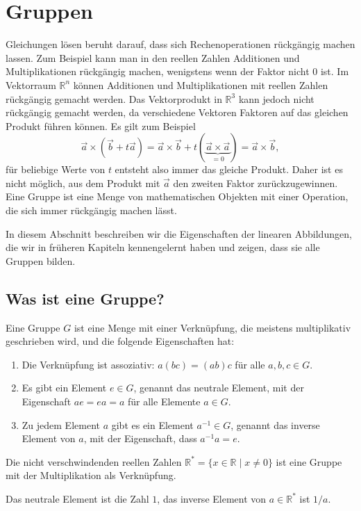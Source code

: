 %
%
%
\section{Gruppen\label{section:gruppen}}
Gleichungen lösen beruht darauf, dass sich Rechenoperationen rückgängig
machen lassen.
Zum Beispiel kann man in den reellen Zahlen Additionen und Multiplikationen
rückgängig machen, wenigstens wenn der Faktor nicht $0$ ist.
Im Vektorraum $\mathbb R^n$ können Additionen und
Multiplikationen mit reellen Zahlen rückgängig gemacht werden.
Das Vektorprodukt in $\mathbb R^3$ kann jedoch nicht rückgängig gemacht
werden, da verschiedene Vektoren Faktoren auf das gleichen Produkt
führen können.
Es gilt zum Beispiel
\[
\vec{a} \times (\vec{b} + t\vec{a})
=
\vec{a} \times \vec{b} + t(\underbrace{\vec{a}\times\vec{a}}_{=0})
=
\vec{a} \times \vec{b},
\]
für beliebige Werte von $t$ entsteht also immer das gleiche Produkt.
Daher ist es nicht möglich, aus dem Produkt mit $\vec{a}$ den
zweiten Faktor zurückzugewinnen.
Eine Gruppe ist eine Menge von mathematischen Objekten mit einer
Operation, die sich immer rückgängig machen lässt.

In diesem Abschnitt beschreiben wir die Eigenschaften der linearen
Abbildungen, die wir in früheren Kapiteln kennengelernt haben und
zeigen, dass sie alle Gruppen bilden.

%
%
\subsection{Was ist eine Gruppe?}
\begin{definition}
Eine Gruppe $G$ ist eine Menge mit einer Verknüpfung, die meistens
multiplikativ geschrieben wird, und die folgende Eigenschaften hat:
\begin{enumerate}
\item Die Verknüpfung ist assoziativ: $a(bc)=(ab)c$ für alle $a,b,c\in G$.
\item Es gibt ein Element $e\in G$, genannt das neutrale Element,
mit der Eigenschaft $ae=ea=a$ für alle
Elemente $a\in G$.
\item Zu jedem Element $a$ gibt es ein Element $a^{-1}\in G$, genannt
das inverse Element von $a$, mit der
Eigenschaft, dass $a^{-1}a=e$.
\end{enumerate}
\end{definition}

\begin{beispiel}
Die nicht verschwindenden reellen Zahlen
$\mathbb R^*=\{x\in\mathbb R\;|\; x\ne 0\}$
ist eine Gruppe mit der Multiplikation als Verknüpfung.

\smallskip

{\parindent0pt Das neutrale} Element ist die Zahl $1$, das inverse Element
von $a\in\mathbb R^*$ ist $1/a$.
\end{beispiel}

